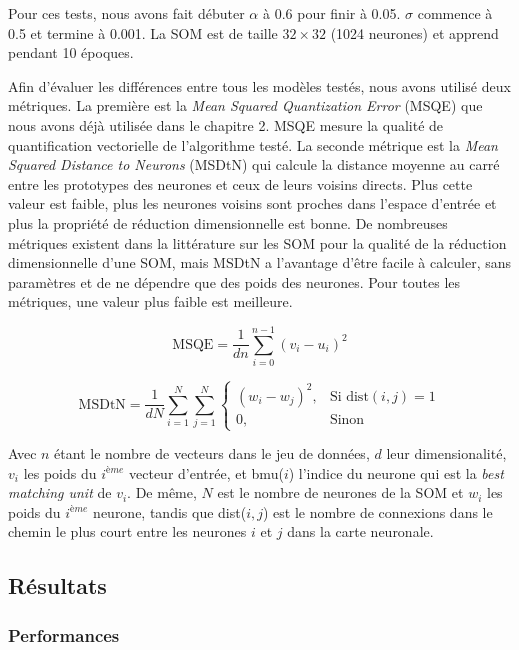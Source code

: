 	Pour ces tests, nous avons fait débuter $\alpha$ à 0.6 pour finir à 0.05. $\sigma$ commence à 0.5 et termine à 0.001. La SOM est de taille $32\times32$ (1024 neurones) et apprend pendant 10 époques.

	Afin d'évaluer les différences entre tous les modèles testés, nous avons utilisé deux métriques. La première est la \textit{Mean Squared Quantization Error} (MSQE) que nous avons déjà utilisée dans le chapitre 2. MSQE mesure la qualité de quantification vectorielle de l'algorithme testé. La seconde métrique est la \textit{Mean Squared Distance to Neurons} (MSDtN) qui calcule la distance moyenne au carré entre les prototypes des neurones et ceux de leurs voisins directs. Plus cette valeur est faible, plus les neurones voisins sont proches dans l'espace d'entrée et plus la propriété de réduction dimensionnelle est bonne. De nombreuses métriques existent dans la littérature sur les SOM pour la qualité de la réduction dimensionnelle d'une SOM, mais MSDtN a l'avantage d'être facile à calculer, sans paramètres et de ne dépendre que des poids des neurones. Pour toutes les métriques, une valeur plus faible est meilleure. 

	\begin{equation}
		\text{MSQE} = \frac{1}{dn} \sum_{i=0}^{n-1} (v_i - u_i)^2
	\end{equation}

	\begin{equation}
    	\text{MSDtN} = \frac{1}{dN} \sum_{i=1}^{N} \sum_{j=1}^{N} 
    	\begin{cases}
        	(w_i - w_j)^2,  & \text{Si dist}(i, j) = 1\\
        	0,              & \text{Sinon}
    	\end{cases}
	\end{equation}

	Avec $n$ étant le nombre de vecteurs dans le jeu de données, $d$ leur dimensionalité, $v_i$ les poids du $i^{ème}$ vecteur d'entrée, et bmu($i$) l'indice du neurone qui est la \textit{best matching unit} de $v_i$. De même, $N$ est le nombre de neurones de la SOM et $w_i$ les poids du $i^{ème}$ neurone, tandis que dist($i, j$) est le nombre de connexions dans le chemin le plus court entre les neurones $i$ et $j$ dans la carte neuronale.

	\subsection{Résultats}
	\subsubsection{Performances}


